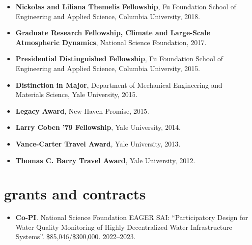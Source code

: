 \documentclass[10pt,oneside]{article}
\begin{document}
\mbox{}\vspace{-\dimexpr\baselineskip\relax}

\begin{itemize}[label={}]

  \item \textbf{Nickolas and Liliana Themelis Fellowship}, Fu Foundation School of Engineering and Applied Science, Columbia University, 2018.

  \item \textbf{Graduate Research Fellowship, Climate and Large-Scale Atmospheric Dynamics}, National Science Foundation, 2017.

  \item \textbf{Presidential Distinguished Fellowship}, Fu Foundation School of Engineering and Applied Science, Columbia University, 2015.

  \item \textbf{Distinction in Major}, Department of Mechanical Engineering and Materials Science, Yale University, 2015.

  \item \textbf{Legacy Award}, New Haven Promise, 2015.

  \item \textbf{Larry Coben ’79 Fellowship}, Yale University, 2014.

  \item \textbf{Vance-Carter Travel Award}, Yale University, 2013.

  \item \textbf{Thomas C. Barry Travel Award}, Yale University, 2012.

\end{itemize}



\section{grants and contracts}

\mbox{}\vspace{-\dimexpr\baselineskip\relax}

\begin{itemize}[label={}]

  \item \textbf{Co-PI}. National Science Foundation EAGER SAI: \enquote{Participatory Design for Water Quality Monitoring of Highly Decentralized Water Infrastructure Systems}. \$85,046/\$300,000. 2022--2023.

\end{itemize}
\end{document}
